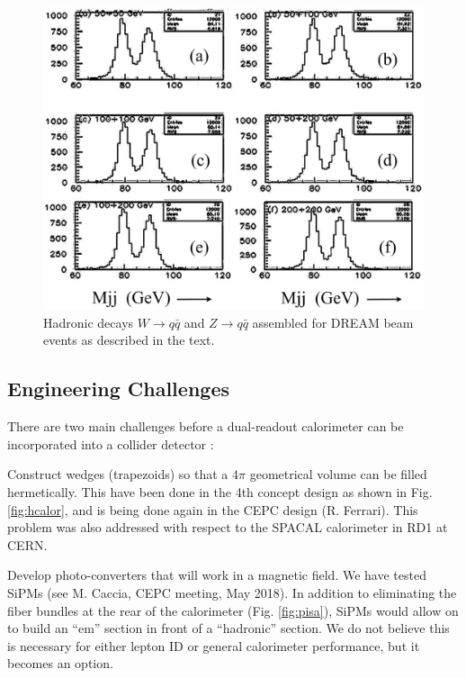\begin{figure}[ht]
 \centering
 \includegraphics[scale=0.45]{WZ-Dream-data-all.jpg}
  \caption{Hadronic decays $W \rightarrow q\bar{q}$ and  $Z \rightarrow q\bar{q}$ assembled for DREAM beam events as described in the text.}
  \label{fig:wz}
\end{figure}


\subsection{Engineering Challenges}


There are two main challenges before a dual-readout calorimeter can be incorporated into a collider detector \cite{cepc}:

\begin{description}

\item Construct wedges (trapezoids) so that a $4 \pi$ geometrical volume can be filled hermetically.   This have been done in the 4th concept design \cite{4th} as shown in Fig. \ref{fig:hcalor}, and is being done again in the CEPC design (R. Ferrari).  This problem was also addressed with respect to the SPACAL calorimeter in RD1 at CERN.

\item Develop photo-converters that will work in a magnetic field.  We have tested SiPMs (see M. Caccia, CEPC meeting, May 2018).  In addition to eliminating the fiber bundles at the rear of the calorimeter (Fig. \ref{fig:pisa}), SiPMs would allow on to build an ``em'' section in front of a ``hadronic'' section.  We do not believe this is necessary for either lepton ID or general calorimeter performance, but it becomes an option. 
 
 \end{description}
 
